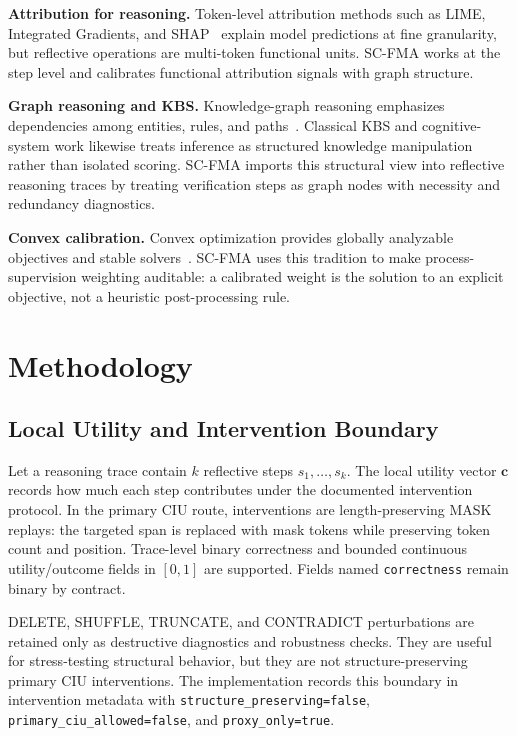 \documentclass[a4paper,fleqn]{cas-sc}
\begin{document}
\textbf{Attribution for reasoning.} Token-level attribution methods such as LIME, Integrated Gradients, and SHAP~\citep{ribeiro2016why,sundararajan2017axiomatic,lundberg2017unified} explain model predictions at fine granularity, but reflective operations are multi-token functional units. SC-FMA works at the step level and calibrates functional attribution signals with graph structure.

\textbf{Graph reasoning and KBS.} Knowledge-graph reasoning emphasizes dependencies among entities, rules, and paths~\citep{bellomarini2024knowledgegraphs}. Classical KBS and cognitive-system work likewise treats inference as structured knowledge manipulation rather than isolated scoring. SC-FMA imports this structural view into reflective reasoning traces by treating verification steps as graph nodes with necessity and redundancy diagnostics.

\textbf{Convex calibration.} Convex optimization provides globally analyzable objectives and stable solvers~\citep{boyd2004convex,nocedal2006numerical}. SC-FMA uses this tradition to make process-supervision weighting auditable: a calibrated weight is the solution to an explicit objective, not a heuristic post-processing rule.

\section{Methodology}
\label{sec:methodology}

\subsection{Local Utility and Intervention Boundary}

Let a reasoning trace contain $k$ reflective steps $s_1,\ldots,s_k$. The local utility vector $\mathbf{c}$ records how much each step contributes under the documented intervention protocol. In the primary CIU route, interventions are length-preserving MASK replays: the targeted span is replaced with mask tokens while preserving token count and position. Trace-level binary correctness and bounded continuous utility/outcome fields in $[0,1]$ are supported. Fields named \texttt{correctness} remain binary by contract.

DELETE, SHUFFLE, TRUNCATE, and CONTRADICT perturbations are retained only as destructive diagnostics and robustness checks. They are useful for stress-testing structural behavior, but they are not structure-preserving primary CIU interventions. The implementation records this boundary in intervention metadata with \texttt{structure\_preserving=false}, \texttt{primary\_ciu\_allowed=false}, and \texttt{proxy\_only=true}.
\end{document}
